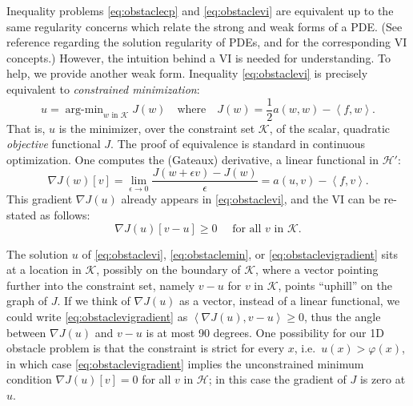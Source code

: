 \documentclass[letterpaper,final,12pt,reqno]{amsart}
\theoremstyle{claim}
\newcommand{\eps}{\epsilon}
\newcommand{\grad}{\nabla}
\newcommand{\ip}[2]{\left<#1,#2\right>}
\numberwithin{equation}{section}
\numberwithin{figure}{section}
\numberwithin{table}{section}
\begin{document}
Inequality problems \eqref{eq:obstaclecp} and \eqref{eq:obstaclevi} are equivalent up to the same regularity concerns which relate the strong and weak forms of a PDE.  (See reference \cite{Evans2010} regarding the solution regularity of PDEs, and \cite{KinderlehrerStampacchia1980} for the corresponding VI concepts.)  However, the intuition behind a VI is needed for understanding.  To help, we provide another weak form.  Inequality \eqref{eq:obstaclevi} is precisely equivalent to \emph{constrained minimization}:
\newcommand{\argmin}{\mathop{\mathrm{arg\text{-}min}}}
\begin{equation}
  u = \argmin_{w \text{ in } \mathcal{K}} J(w) \quad \text{where} \quad J(w) = \frac{1}{2} a(w,w) - \ip{f}{w}. \label{eq:obstaclemin}
\end{equation}
That is, $u$ is the minimizer, over the constraint set $\mathcal{K}$, of the scalar, quadratic \emph{objective} functional $J$.  The proof of equivalence is standard in continuous optimization.  One computes the (Gateaux) derivative, a linear functional in $\mathcal{H}'$:
\begin{equation}
  \grad J(w)[v] = \lim_{\eps\to 0} \frac{J(w+\eps v) - J(w)}{\eps} = a(u,v) - \ip{f}{v}.  \label{eq:gradobjective}
\end{equation}
This gradient $\nabla J(u)$ already appears in \eqref{eq:obstaclevi}, and the VI can be re-stated as follows:
\begin{equation}
  \nabla J(u)[v-u] \ge 0 \quad \text{ for all } v \text{ in } \mathcal{K}. \label{eq:obstaclevigradient}
\end{equation}

The solution $u$ of \eqref{eq:obstaclevi}, \eqref{eq:obstaclemin}, or \eqref{eq:obstaclevigradient} sits at a location in $\mathcal{K}$, possibly on the boundary of $\mathcal{K}$, where a vector pointing further into the constraint set, namely $v-u$ for $v$ in $\mathcal{K}$, points ``uphill'' on the graph of $J$.  If we think of $\nabla J(u)$ as a vector, instead of a linear functional, we could write \eqref{eq:obstaclevigradient} as $\ip{\nabla J(u)}{v-u} \ge 0$, thus the angle between $\nabla J(u)$ and $v-u$ is at most 90 degrees.  One possibility for our 1D obstacle problem is that the constraint is strict for every $x$, i.e.~$u(x) > \varphi(x)$, in which case \eqref{eq:obstaclevigradient} implies the unconstrained minimum condition $\nabla J(u)[v] = 0$ for all $v$ in $\mathcal{H}$; in this case the gradient of $J$ is zero at $u$.
\end{document}
